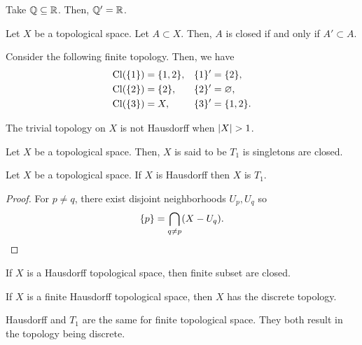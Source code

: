 \documentclass[12pt]{book} %
\DeclareMathOperator{\Cl}{Cl}
\begin{document}
\begin{example}
Take \( \mathbb{Q} \subseteq \mathbb{R} \).
Then, \( \mathbb{Q}' = \mathbb{R} \).
\end{example}

\begin{theorem}
Let \( X \) be a topological space.
Let \( A \subset X \).
Then, \( A \) is closed if and only if \( A' \subset A \).
\end{theorem}

\begin{example}
Consider the following finite topology.
Then, we have
\begin{align*}
\Cl(\set 1) &= \set{1, 2}, & \set 1' &= \set 2, \\
\Cl(\set 2) &= \set 2, & \set 2' &= \emptyset, \\
\Cl(\set 3) &= X, & \set 3' &= \set{1, 2}.
\end{align*}
\end{example}

\begin{example}
The trivial topology on \( X \) is not Hausdorff when \( \lvert X\rvert > 1 \).
\end{example}

\begin{definition}
Let \( X \) be a topological space.
Then, \( X \) is said to be \( T_1 \) is singletons are closed.
\end{definition}

\begin{lemma}
Let \( X \) be a topological space.
If \( X \) is Hausdorff then \( X \) is \( T_1 \).
\end{lemma}

\begin{proof}
For \( p \neq q \), there exist disjoint neighborhoods \( U_p, U_q \) so
\[ \{p\} = \bigcap_{q \neq p} (X - U_q). \]
\end{proof}

\begin{corollary}
If \( X \) is a Hausdorff topological space, then finite subset are closed.
\end{corollary}

\begin{corollary}
If \( X \) is a finite Hausdorff topological space, then \( X \) has the discrete topology.
\end{corollary}

\begin{note}
Hausdorff and \( T_1 \) are the same for finite topological space.
They both result in the topology being discrete.
\end{note}
\end{document}
